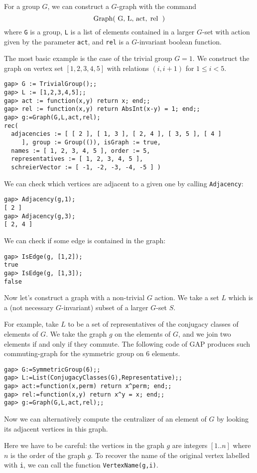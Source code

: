 For a group $G$, we can construct a $G$-graph with the command
\[ \text{\lstinline{Graph( G, L, act, rel )}}\]
where \lstinline{G} is a group, \lstinline{L} is a list of elements contained in a larger $G$-set with action given by the parameter \lstinline{act}, and \lstinline{rel} is a $G$-invariant boolean function.

The most basic example is the case of the trivial group $G = 1$.
We construct the graph on vertex set $[1,2,3,4,5]$ with relations $(i,i+1)$ for $1\leq i < 5$.

\begin{lstlisting}
gap> G := TrivialGroup();;
gap> L := [1,2,3,4,5];;
gap> act := function(x,y) return x; end;;
gap> rel := function(x,y) return AbsInt(x-y) = 1; end;;
gap> g:=Graph(G,L,act,rel);
rec(
  adjacencies := [ [ 2 ], [ 1, 3 ], [ 2, 4 ], [ 3, 5 ], [ 4 ]
     ], group := Group(()), isGraph := true,
  names := [ 1, 2, 3, 4, 5 ], order := 5,
  representatives := [ 1, 2, 3, 4, 5 ],
  schreierVector := [ -1, -2, -3, -4, -5 ] )
\end{lstlisting}
We can check which vertices are adjacent to a given one by calling \lstinline{Adjacency}:
\begin{lstlisting}
gap> Adjacency(g,1);
[ 2 ]
gap> Adjacency(g,3);
[ 2, 4 ]
\end{lstlisting}
We can check if some edge is contained in the graph:
\begin{lstlisting}
gap> IsEdge(g, [1,2]);
true
gap> IsEdge(g, [1,3]);
false
\end{lstlisting}

Now let's construct a graph with a non-trivial $G$ action.
We take a set $L$ which is a (not necessary $G$-invariant) subset of a larger $G$-set $S$.

For example, take $L$ to be a set of representatives of the conjugacy classes of elements of $G$.
We take the graph $g$ on the elements of $G$, and we join two elements if and only if they commute.
The following code of GAP produces such commuting-graph for the symmetric group on $6$ elements.
\begin{lstlisting}
gap> G:=SymmetricGroup(6);;
gap> L:=List(ConjugacyClasses(G),Representative);;
gap> act:=function(x,perm) return x^perm; end;;
gap> rel:=function(x,y) return x^y = x; end;;
gap> g:=Graph(G,L,act,rel);;
\end{lstlisting}
Now we can alternatively compute the centralizer of an element of $G$ by looking its adjacent vertices in this graph.

Here we have to be careful: the vertices in the graph $g$ are integers $[1..n]$ where $n$ is the order of the graph $g$.
To recover the name of the original vertex labelled with \lstinline{i}, we can call the function \lstinline{VertexName(g,i)}.

